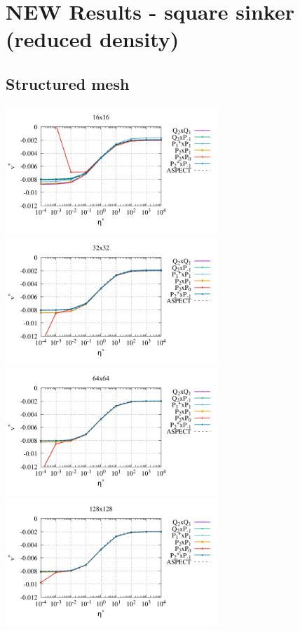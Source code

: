 \newpage
\section*{NEW Results - square sinker (reduced density)}

\subsection*{Structured mesh}

\begin{center}
\includegraphics[width=8cm]{python_codes/fieldstone_120/paperresults/sinker_reduced/structured/sinker_reduced_vel_16}
\includegraphics[width=8cm]{python_codes/fieldstone_120/paperresults/sinker_reduced/structured/sinker_reduced_vel_32}\\
\includegraphics[width=8cm]{python_codes/fieldstone_120/paperresults/sinker_reduced/structured/sinker_reduced_vel_64}
\includegraphics[width=8cm]{python_codes/fieldstone_120/paperresults/sinker_reduced/structured/sinker_reduced_vel_128}\\

\end{center}
